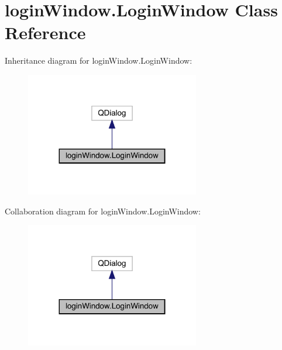 \hypertarget{classlogin_window_1_1_login_window}{}\section{login\+Window.\+Login\+Window Class Reference}
\label{classlogin_window_1_1_login_window}


Inheritance diagram for login\+Window.\+Login\+Window\+:\nopagebreak
\begin{figure}[H]
\begin{center}
\leavevmode
\includegraphics[width=215pt]{classlogin_window_1_1_login_window__inherit__graph}
\end{center}
\end{figure}


Collaboration diagram for login\+Window.\+Login\+Window\+:\nopagebreak
\begin{figure}[H]
\begin{center}
\leavevmode
\includegraphics[width=215pt]{classlogin_window_1_1_login_window__coll__graph}
\end{center}
\end{figure}
